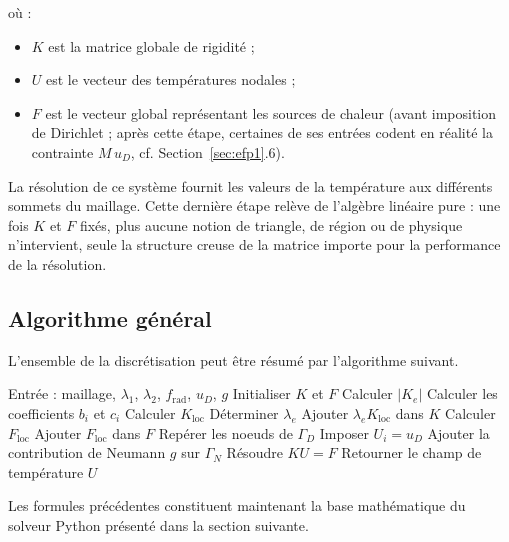 \documentclass[12pt,a4paper]{article}
\begin{document}
	où :
	\begin{itemize}
		\item $K$ est la matrice globale de rigidité ;
		\item $U$ est le vecteur des températures nodales ;
		\item $F$ est le vecteur global représentant les sources de chaleur (avant imposition de Dirichlet ; après cette étape, certaines de ses entrées codent en réalité la contrainte $M\,u_D$, cf. Section~\ref{sec:efp1}.6).
	\end{itemize}
	
	La résolution de ce système fournit les valeurs de la température aux
	différents sommets du maillage. Cette dernière étape relève de l'algèbre linéaire pure : une fois $K$ et $F$ fixés, plus aucune notion de triangle, de région ou de physique n'intervient, seule la structure creuse de la matrice importe pour la performance de la résolution.
	
	\subsection{Algorithme général}
	
	L'ensemble de la discrétisation peut être résumé par l'algorithme
	suivant.
	
	\begin{algorithm}[H]
		\caption{Assemblage du système EF-P1}
		\begin{algorithmic}[1]
			\State Entrée : maillage, $\lambda_1$, $\lambda_2$, $f_{\mathrm{rad}}$, $u_D$, $g$
			\State Initialiser $K$ et $F$
			\State Calculer $|K_e|$
			\State Calculer les coefficients $b_i$ et $c_i$
			\State Calculer $K_{\mathrm{loc}}$
			\State Déterminer $\lambda_e$
			\State Ajouter $\lambda_e K_{\mathrm{loc}}$ dans $K$
			\State Calculer $F_{\mathrm{loc}}$
			\State Ajouter $F_{\mathrm{loc}}$ dans $F$
			\EndFor
			\State Repérer les noeuds de $\Gamma_D$
			\State Imposer $U_i=u_D$
			\State Ajouter la contribution de Neumann $g$ sur $\Gamma_N$
			\State Résoudre $KU=F$
			\State Retourner le champ de température $U$
		\end{algorithmic}
	\end{algorithm}
	
	Les formules précédentes constituent maintenant la base mathématique
	du solveur Python présenté dans la section suivante.
	
\end{document}
